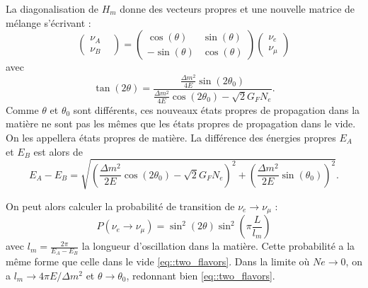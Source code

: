             La diagonalisation de $H_m$ donne des vecteurs propres et une nouvelle matrice de mélange s'écrivant :
            \begin{equation}
                 \left(\begin{matrix}\nu_A & \\ \nu_B\end{matrix}\right) = \left(\begin{matrix}\cos(\theta) & \sin(\theta) \\ -\sin(\theta) & \cos(\theta)\end{matrix}\right)\left(\begin{matrix}\nu_e \\ \nu_{\mu}\end{matrix}\right)
            \end{equation}
            avec 
            \begin{equation}\label{eq::tan2theta}
                \tan(2\theta)=\frac{\frac{\Delta m^2}{4E}\sin(2\theta_0)}{\frac{\Delta m^2}{4E}\cos(2\theta_0)-\sqrt{2}G_F N_e}.
            \end{equation}
            Comme $\theta$ et $\theta_0$ sont différents, ces nouveaux états propres de propagation dans la matière ne sont pas les mêmes que les états propres de propagation dans le vide. On les appellera états propres de matière. La différence des énergies propres $E_A$ et $E_B$ est alors de 
            \begin{equation}
                E_A - E_B = \sqrt{\left(\frac{\Delta m^2}{2E}\cos(2\theta_0)-\sqrt{2}G_F N_e\right)^2 + \left(\frac{\Delta m^2}{2E}\sin(\theta_0)\right)^2}.
            \end{equation}
            
            On peut alors calculer la probabilité de transition de  $\nu_e\to\nu_{\mu}$ : 
            \begin{equation}\label{eq::two_flavors_matter}
                P(\nu_e\to\nu_{\mu}) = \sin^2(2\theta)\sin^2\left(\pi\frac{L}{l_m}\right)
            \end{equation}
            avec $l_m=\frac{2\pi}{E_A-E_B}$ la longueur d'oscillation dans la matière. Cette probabilité a la même forme que celle dans le vide \eqref{eq::two_flavors}. Dans la limite où $Ne\to 0$, on a $l_m\to 4\pi E/\Delta m^2$ et $\theta \to \theta_0$, redonnant bien \eqref{eq::two_flavors}.
            
